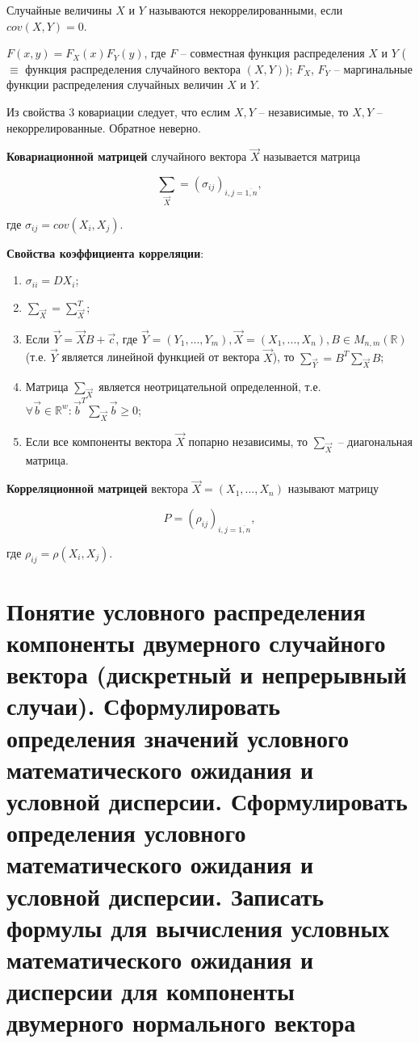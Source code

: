 Случайные величины $X$ и $Y$ называются некоррелированными, если $cov(X, Y) = 0$.

\(F(x, y) = F_X(x) F_Y(y)\), где \( F \) -- совместная функция распределения \( X \) и \( Y \) ($\equiv$ функция распределения случайного вектора \( (X, Y) \)); \( F_X \), \( F_Y \) -- маргинальные функции распределения случайных величин \( X \) и \( Y \).

Из свойства 3 ковариации следует, что еслим $X, Y$ -- независимые, то $X, Y$ -- некоррелированные. Обратное неверно.

\textbf{Ковариационной матрицей} случайного вектора $\vec{X}$ называется матрица

\[
\sum_{\vec{X}} = (\sigma_{ij})_{i, j = \overline{1, n}},
\]

где $\sigma_{ij} = cov(X_i, X_j)$.

\textbf{Свойства коэффициента корреляции}:
\begin{enumerate}
	\item $\sigma_{ii} = DX_i$;
	\item $\sum_{\vec{X}} = \sum_{\vec{X}}^{T}$;
	\item Если $\vec{Y} = \vec{X}B + \vec{c}$, где $\vec{Y} = (Y_1, ..., Y_m), \vec{X} = (X_1, ..., X_n), B \in M_{n, m}(\mathbb{R})$ (т.е. $\vec{Y}$ является линейной функцией от вектора $\vec{X}$), то $\sum_{\vec{Y}} = B^T \sum_{\vec{X}} B$;
	\item Матрица $\sum_{\vec{X}}$ является неотрицательной определенной, т.е. $\forall \vec{b} \in \mathbb{R}^w: \vec{b}^T \sum_{\vec{X}} \vec{b} \geq 0$;
	\item Если все компоненты вектора $\vec{X}$ попарно независимы, то $\sum_{\vec{X}}$ -- диагональная матрица.
\end{enumerate}
	
\textbf{Корреляционной матрицей} вектора $\vec{X} = (X_1, ..., X_n)$ называют матрицу

\[
P = (\rho_{ij})_{i, j = \overline{1, n}}, 
\]

где $\rho_{ij} =\rho(X_i, X_j)$.


\section{Понятие условного распределения компоненты двумерного случайного вектора (дискретный и непрерывный случаи). Сформулировать определения значений условного математического ожидания и условной дисперсии. Сформулировать определения условного математического ожидания и условной дисперсии. Записать формулы для вычисления условных математического ожидания и дисперсии для компоненты двумерного нормального вектора}

